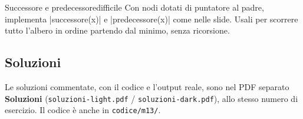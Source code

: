\begin{esercizio}{Successore e predecessore}{difficile}
Con nodi dotati di puntatore al padre, implementa \cc|successore(x)| e
\cc|predecessore(x)| come nelle slide. Usali per scorrere tutto l'albero in ordine
partendo dal minimo, senza ricorsione.
\end{esercizio}

\subsection*{Soluzioni}
Le soluzioni commentate, con il codice e l'output reale, sono nel PDF separato
\textbf{Soluzioni} (\texttt{soluzioni-light.pdf} / \texttt{soluzioni-dark.pdf}),
allo stesso numero di esercizio. Il codice è anche in \texttt{codice/m13/}.

